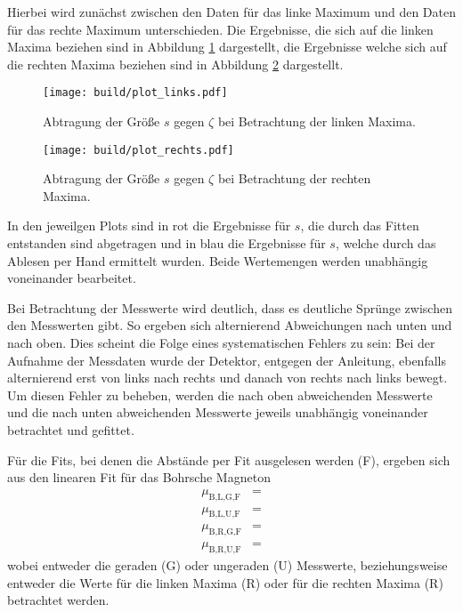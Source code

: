 Hierbei wird zunächst zwischen den Daten für das linke Maximum und den Daten für das rechte Maximum unterschieden.
Die Ergebnisse, die sich auf die linken Maxima beziehen sind in Abbildung \ref{fig:plotlinks} dargestellt, die Ergebnisse welche sich auf die rechten Maxima beziehen sind in Abbildung \ref{fig:plotrechts} dargestellt.
\begin{figure}
  \centering
  \texttt{[image: build/plot\_links.pdf]}
  \caption{Abtragung der Größe $s$ gegen $\zeta$ bei Betrachtung der linken Maxima.}
  \label{fig:plotlinks}
\end{figure}

\begin{figure}
  \centering
  \texttt{[image: build/plot\_rechts.pdf]}
  \caption{Abtragung der Größe $s$ gegen $\zeta$ bei Betrachtung der rechten Maxima.}
  \label{fig:plotrechts}
\end{figure}

In den jeweilgen Plots sind in rot die Ergebnisse für $s$, die durch das Fitten entstanden sind abgetragen und in blau die Ergebnisse für $s$, welche durch das Ablesen per Hand ermittelt wurden.
Beide Wertemengen werden unabhängig voneinander bearbeitet.

Bei Betrachtung der Messwerte wird deutlich, dass es deutliche Sprünge zwischen den Messwerten gibt.
So ergeben sich alternierend Abweichungen nach unten und nach oben.
Dies scheint die Folge eines systematischen Fehlers zu sein: Bei der Aufnahme der Messdaten wurde der Detektor, entgegen der Anleitung, ebenfalls alternierend erst von links nach rechts und danach von rechts nach links bewegt.
Um diesen Fehler zu beheben, werden die nach oben abweichenden Messwerte und die nach unten abweichenden Messwerte jeweils unabhängig voneinander betrachtet und gefittet.

Für die Fits, bei denen die Abstände per Fit ausgelesen werden (F), ergeben sich aus den linearen Fit für das Bohrsche Magneton
\begin{align*}
  \mu_{\text{B,L,G,F}} &= \\
  \mu_{\text{B,L,U,F}} &= \\
  \mu_{\text{B,R,G,F}} &= \\
  \mu_{\text{B,R,U,F}} &= 
\end{align*}
wobei entweder die geraden (G) oder ungeraden (U) Messwerte, beziehungsweise entweder die Werte für die linken Maxima (R) oder für die rechten Maxima (R) betrachtet werden.

